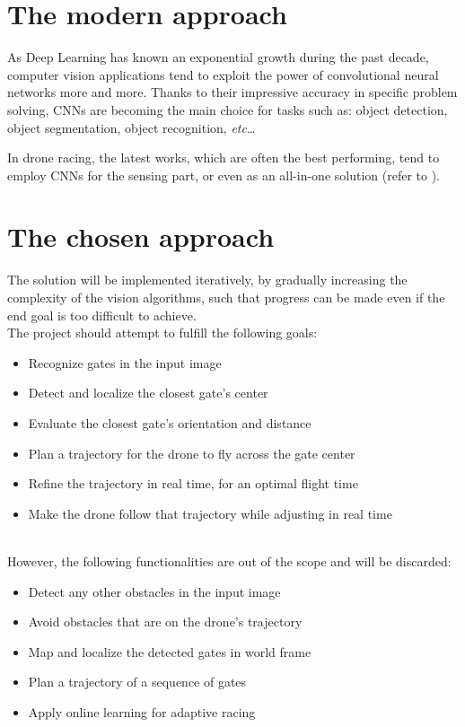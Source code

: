 \section{The modern approach}


As Deep Learning has known an exponential growth during the past decade,
computer vision applications tend to exploit the power of convolutional neural
networks more and more. Thanks to their impressive accuracy in specific problem
solving, CNNs are becoming the main choice for tasks such as: object detection,
object segmentation, object recognition, \emph{etc}\ldots

In drone racing, the latest works, which are often the best performing, tend to
employ CNNs for the sensing part, or even as an all-in-one solution (refer to
).\\


\section{The chosen approach}


The solution will be implemented iteratively, by gradually increasing the
complexity of the vision algorithms, such that progress can be made even if the
end goal is too difficult to achieve.\\

The project should attempt to fulfill the following goals:

\begin{itemize}
	\item{Recognize gates in the input image}
	\item{Detect and localize the closest gate's center}
	\item{Evaluate the closest gate's orientation and distance}
	\item{Plan a trajectory for the drone to fly across the gate center}
	\item{Refine the trajectory in real time, for an optimal flight time}
	\item{Make the drone follow that trajectory while adjusting in real time}
\end{itemize}
~\\
However, the following functionalities are out of the scope and will be
discarded:

\begin{itemize}
	\item{Detect any other obstacles in the input image}
	\item{Avoid obstacles that are on the drone's trajectory}
	\item{Map and localize the detected gates in world frame}
	\item{Plan a trajectory of a sequence of gates}
	\item{Apply online learning for adaptive racing}
\end{itemize}

